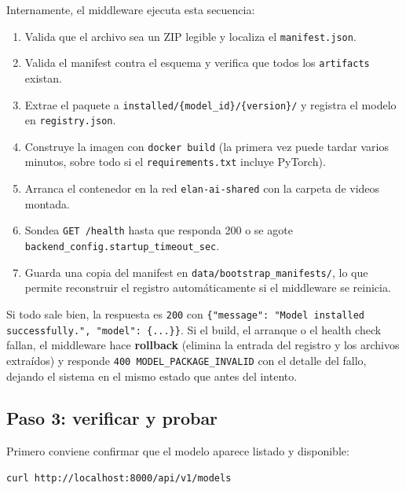 \documentclass[12pt,a4paper]{article}
\begin{document}
Internamente, el middleware ejecuta esta secuencia:

\begin{enumerate}[noitemsep, topsep=2pt]
    \item Valida que el archivo sea un ZIP legible y localiza el \texttt{manifest.json}.
    \item Valida el manifest contra el esquema y verifica que todos los \texttt{artifacts} existan.
    \item Extrae el paquete a \texttt{installed/\{model\_id\}/\{version\}/} y registra el modelo en \texttt{registry.json}.
    \item Construye la imagen con \texttt{docker build} (la primera vez puede tardar varios minutos, sobre todo si el \texttt{requirements.txt} incluye PyTorch).
    \item Arranca el contenedor en la red \texttt{elan-ai-shared} con la carpeta de videos montada.
    \item Sondea \texttt{GET /health} hasta que responda 200 o se agote \texttt{backend\_config.startup\_timeout\_sec}.
    \item Guarda una copia del manifest en \texttt{data/bootstrap\_manifests/}, lo que permite reconstruir el registro automáticamente si el middleware se reinicia.
\end{enumerate}

Si todo sale bien, la respuesta es \texttt{200} con \texttt{\{"message": "Model installed successfully.", "model": \{...\}\}}. Si el build, el arranque o el health check fallan, el middleware hace \textbf{rollback} (elimina la entrada del registro y los archivos extraídos) y responde \texttt{400 MODEL\_PACKAGE\_INVALID} con el detalle del fallo, dejando el sistema en el mismo estado que antes del intento.

\subsection{Paso 3: verificar y probar}

Primero conviene confirmar que el modelo aparece listado y disponible:

\begin{center}
\begin{minipage}{0.9\textwidth}
\small
\begin{Verbatim}[baselinestretch=0.9]
curl http://localhost:8000/api/v1/models
\end{Verbatim}
\end{minipage}
\end{center}
\end{document}
